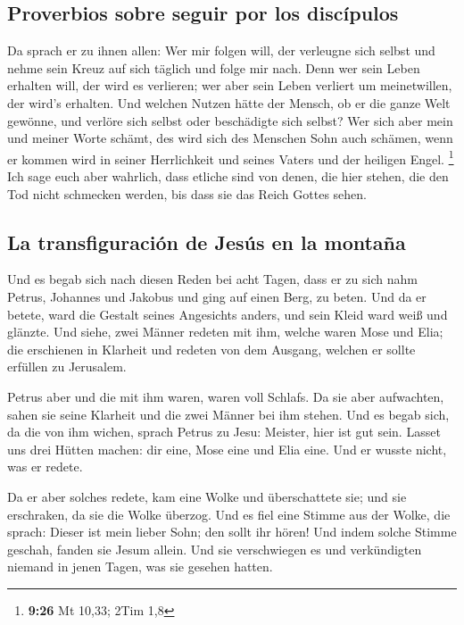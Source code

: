 \hypertarget{proverbios-sobre-seguir-por-los-discuxedpulos}{%
\subsection{Proverbios sobre seguir por los
discípulos}\label{proverbios-sobre-seguir-por-los-discuxedpulos}}

 Da sprach er zu ihnen allen: Wer mir folgen will, der
verleugne sich selbst und nehme sein Kreuz auf sich täglich und folge
mir nach.  Denn wer sein Leben erhalten will, der wird es
verlieren; wer aber sein Leben verliert um meinetwillen, der wird's
erhalten.  Und welchen Nutzen hätte der Mensch, ob er die
ganze Welt gewönne, und verlöre sich selbst oder beschädigte sich
selbst?  Wer sich aber mein und meiner Worte schämt, des
wird sich des Menschen Sohn auch schämen, wenn er kommen wird in seiner
Herrlichkeit und seines Vaters und der heiligen Engel. \footnote{\textbf{9:26}
  Mt 10,33; 2Tim 1,8}  Ich sage euch aber wahrlich, dass
etliche sind von denen, die hier stehen, die den Tod nicht schmecken
werden, bis dass sie das Reich Gottes sehen.

\hypertarget{la-transfiguraciuxf3n-de-jesuxfas-en-la-montauxf1a}{%
\subsection{La transfiguración de Jesús en la
montaña}\label{la-transfiguraciuxf3n-de-jesuxfas-en-la-montauxf1a}}

 Und es begab sich nach diesen Reden bei acht Tagen, dass
er zu sich nahm Petrus, Johannes und Jakobus und ging auf einen Berg, zu
beten.  Und da er betete, ward die Gestalt seines
Angesichts anders, und sein Kleid ward weiß und glänzte. 
Und siehe, zwei Männer redeten mit ihm, welche waren Mose und Elia;
 die erschienen in Klarheit und redeten von dem Ausgang,
welchen er sollte erfüllen zu Jerusalem.

 Petrus aber und die mit ihm waren, waren voll Schlafs.
Da sie aber aufwachten, sahen sie seine Klarheit und die zwei Männer bei
ihm stehen.  Und es begab sich, da die von ihm wichen,
sprach Petrus zu Jesu: Meister, hier ist gut sein. Lasset uns drei
Hütten machen: dir eine, Mose eine und Elia eine. Und er wusste nicht,
was er redete.

 Da er aber solches redete, kam eine Wolke und
überschattete sie; und sie erschraken, da sie die Wolke überzog.
 Und es fiel eine Stimme aus der Wolke, die sprach:
Dieser ist mein lieber Sohn; den sollt ihr hören!  Und
indem solche Stimme geschah, fanden sie Jesum allein. Und sie
verschwiegen es und verkündigten niemand in jenen Tagen, was sie gesehen
hatten.

